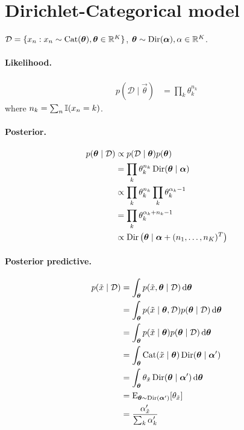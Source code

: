 \section{Dirichlet-Categorical model}
$\mathcal D = \{x_n : x_n \sim \operatorname{Cat}(\boldsymbol{\mathbf{\theta}}), \boldsymbol{\mathbf{\theta}} \in \mathbb R^K\}$, $\boldsymbol{\mathbf{\theta}} \sim \operatorname{Dir}(\boldsymbol{\mathbf{\alpha}}), \alpha \in \mathbb R^K$.

\paragraph{Likelihood.}
    \begin{align*}
        p(\mathcal D \mid \vec \theta) &= \prod_k \theta_k^{n_k}
    \end{align*}
    where $n_k = \sum_n \operatorname{\mathbb I}(x_n = k)$.

\paragraph{Posterior.}
    \begin{align*}
        p(\boldsymbol{\mathbf{\theta}} \mid \mathcal D)  &\propto p(\mathcal D \mid \boldsymbol{\mathbf{\theta}}) p(\boldsymbol{\mathbf{\theta}}) \\
                                        &= \prod_k \theta_k^{n_k} \operatorname{Dir}(\boldsymbol{\mathbf{\theta}} \mid \boldsymbol{\mathbf{\alpha}}) \\
                                        &\propto \prod_k \theta_k^{n_k} \prod_k \theta_k^{\alpha_k - 1} \\
                                        &= \prod_k \theta_k^{\alpha_k + n_k - 1} \\
                                        &\propto \operatorname{Dir}\left(\boldsymbol{\mathbf{\theta}} \mid \boldsymbol{\mathbf{\alpha}} + (n_1, \dotsc, n_K)^T\right)
    \end{align*}

\paragraph{Posterior predictive.}
    \begin{align*}
        p(\tilde x \mid \mathcal D)     &= \int_{\boldsymbol{\mathbf{\theta}}} p(\tilde x, \boldsymbol{\mathbf{\theta}} \mid \mathcal D) \,\mathrm d\boldsymbol{\mathbf{\theta}} \\
                                        &= \int_{\boldsymbol{\mathbf{\theta}}} p(\tilde x \mid \boldsymbol{\mathbf{\theta}}, \mathcal D) p(\boldsymbol{\mathbf{\theta}} \mid \mathcal D) \,\mathrm d\boldsymbol{\mathbf{\theta}} \\
                                        &= \int_{\boldsymbol{\mathbf{\theta}}} p(\tilde x \mid \boldsymbol{\mathbf{\theta}}) p(\boldsymbol{\mathbf{\theta}} \mid \mathcal D) \,\mathrm d\boldsymbol{\mathbf{\theta}} \\
                                        &= \int_{\boldsymbol{\mathbf{\theta}}} \operatorname{Cat}(\tilde x \mid \boldsymbol{\mathbf{\theta}}) \operatorname{Dir}(\boldsymbol{\mathbf{\theta}} \mid \boldsymbol{\mathbf{\alpha}}') \\
                                        &= \int_{\boldsymbol{\mathbf{\theta}}} \theta_{\tilde x} \operatorname{Dir}(\boldsymbol{\mathbf{\theta}} \mid \boldsymbol{\mathbf{\alpha}}') \,\mathrm d\boldsymbol{\mathbf{\theta}} \\
                                        &= \operatorname{\mathrm{E}}_{\boldsymbol{\mathbf{\theta}} \sim \operatorname{Dir}(\boldsymbol{\mathbf{\alpha}}')}[\theta_{\tilde x}] \\
                                        &= \frac{\alpha'_{\tilde x}}{\sum_k \alpha'_k}
    \end{align*}